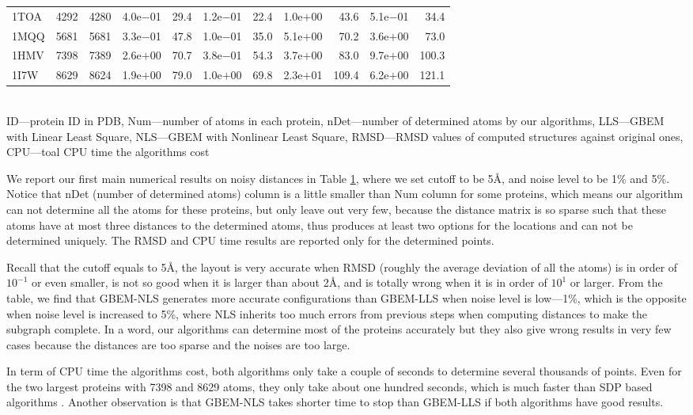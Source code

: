 \documentclass[a4paper,12pt]{article}
\begin{document}
\begin{table}[htb!]
{\begin{tabular}{lrrrrrrrrrr}
  1TOA & 4292 & 4280 & 4.0e$-$01 & 29.4 & 1.2e$-$01 & 22.4 & 1.0e$+$00 &  43.6 & 5.1e$-$01&  34.4  \\
  1MQQ & 5681 & 5681 & 3.3e$-$01 & 47.8 & 1.0e$-$01 & 35.0 & 5.1e$+$00 &  70.2 & 3.6e$+$00&  73.0  \\
  1HMV & 7398 & 7389 & 2.6e$+$00 & 70.7 & 3.8e$-$01 & 54.3 & 3.7e$+$00 &  83.0 & 9.7e$+$00& 100.3  \\
  1I7W & 8629 & 8624 & 1.9e$+$00 & 79.0 & 1.0e$+$00 & 69.8 & 2.3e$+$01 & 109.4 & 6.2e$+$00& 121.1  \\ \toprule
\end{tabular}\\[-4mm]
\label{table:cut5}
\bl ID---protein ID in PDB, Num---number of atoms in each protein, nDet---number of determined atoms by our algorithms, LLS---GBEM with Linear Least Square, NLS---GBEM with Nonlinear Least Square, RMSD---RMSD values of computed structures against original ones, CPU---toal CPU time the algorithms cost \el
}
\end{table}

We report our first main numerical results on noisy distances in Table \ref{table:cut5}, where we set cutoff to be 5\AA, and noise level to be 1\% and 5\%. Notice that nDet (number of determined atoms) column is a little smaller than Num column for some proteins, which means our algorithm can not determine all the atoms for these proteins, but only leave out very few, because the distance matrix is so sparse such that these atoms have at most three distances to the determined atoms, thus produces at least two options for the locations and can not be determined uniquely. The RMSD and CPU time results are reported only for the determined points.

Recall that the cutoff equals to 5\AA, the layout is very accurate when RMSD (roughly the average deviation of all the atoms) is in order of $10^{-1}$ or even smaller, is not so good when it is larger than about 2\AA, and is totally wrong when it is in order of $10^{1}$ or larger. From the table, we find that GBEM-NLS generates more accurate configurations than GBEM-LLS when noise level is low---1\%, which is the opposite when noise level is increased to 5\%, where NLS inherits too much errors from previous steps when computing distances to make the subgraph complete. In a word, our algorithms can determine most of the proteins accurately but they also give wrong results in very few cases because the distances are too sparse and the noises are too large.

In term of CPU time the algorithms cost, both algorithms only take a couple of seconds to determine several thousands of points. Even for the two largest proteins with 7398 and 8629 atoms, they only take about one hundred seconds, which is much faster than SDP based algorithms \cite{Biswas2008}. Another observation is that GBEM-NLS takes shorter time to stop than GBEM-LLS if both algorithms have good results.
\end{document}
